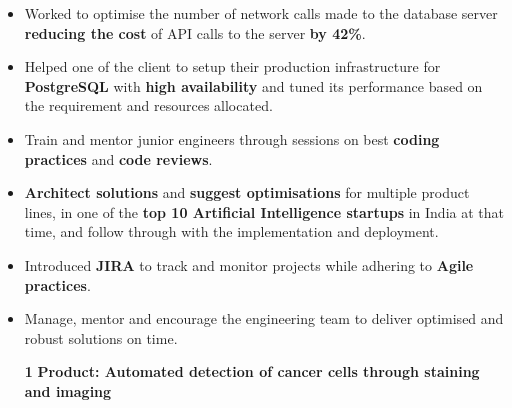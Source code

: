 \documentclass[10pt,a4paper,ragged2e,withhyper]{altacv}
\begin{document}
\begin{paracol}{2}
\begin{itemize}
\item Worked to optimise the number of network calls made to the database server \textbf{reducing the cost} of API calls to the server \textbf{by 42\%}.
\item Helped one of the client to setup their production infrastructure for \textbf{PostgreSQL} with \textbf{high availability} and tuned its performance based on the requirement and resources allocated.
\item Train and mentor junior engineers through sessions on best \textbf{coding practices} and \textbf{code reviews}.
\end{itemize}

\divider


\begin{itemize}
\item \textbf{Architect solutions} and \textbf{suggest optimisations} for multiple product lines, in one of the \textbf{top 10 Artificial Intelligence startups} in India at that time, and follow through with the implementation and deployment.
\item Introduced \textbf{JIRA} to track and monitor projects while adhering to \textbf{Agile practices}.
\item Manage, mentor and encourage the engineering team to deliver optimised and robust solutions on time.

\vspace{2pt}

\item[\textbf{1}] \textbf{Product: Automated detection of cancer cells through staining and imaging}


\end{itemize}
\end{paracol}
\end{document}
